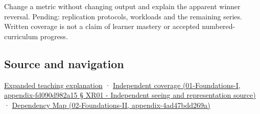 Change a metric without changing output and explain the apparent winner reversal. Pending: replication protocols, workloads and the remaining series. Written coverage is not a claim of learner mastery or accepted numbered-curriculum progress.

\subsection{Source and navigation}\label{source-and-navigation}

\href{Continuous\%20Notes/University\%20-\%20Worlds,\%20Images\%20and\%20Inference\%20-\%20Graphics,\%20Vision\%20and\%20Photography\#Make\%20the\%20mathematics\%20operational\%20without\%20pretending\%20to\%20run\%20a\%20human\%20study}{Expanded teaching explanation} · \href{}{Independent coverage (01-Foundations-I, appendix-fd090d982a15 § XR01 - Independent seeing and representation source)} · \href{}{Dependency Map (02-Foundations-II, appendix-4ad47bdd269a)}
